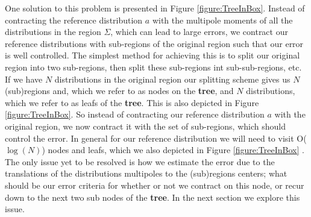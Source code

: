 \documentclass[prb,aps,nobibnotes,twocolumn,doublespace,twocolumngrid,superbib]{revtex4}
\begin{document}
One solution to this problem is presented in Figure {\ref{figure:TreeInBox}}. 
%
Instead of contracting the reference distribution $a$ with the multipole moments of all the 
distributions in the region $\Sigma$, which can lead to large errors, we contract our reference 
distributions with sub-regions of the original region such that our error is well controlled. 
%
The simplest method for achieving this is to split our original region into two sub-regions, then split 
these sub-regions int sub-sub-regions, etc. 
%
If we have $N$ distributions in the original region our splitting scheme gives us $N$ (sub)regions and, which 
we refer to as nodes on the {\bf tree}, 
and $N$ distributions, which we refer to as leafs of the {\bf tree}. 
%
This is also depicted in  Figure {\ref{figure:TreeInBox}}. 
%
So instead of contracting our reference distribution $a$ with the 
original region, we now contract it with the set of sub-regions, which should control the error. 
%
In general for our reference distribution we will need to visit {\cal O}($\log (N)$) nodes and 
leafs, which we also depicted in 
Figure {\ref{figure:TreeInBox}} . 
%
The only issue yet to be resolved is how we estimate the error due to the translations of the 
distributions multipoles to the (sub)regions centers; what should be our error criteria for whether 
or not we contract on this node, or recur down to the 
next two sub nodes of the {\bf tree}. 
%
In the next section we explore this issue.
\end{document}
